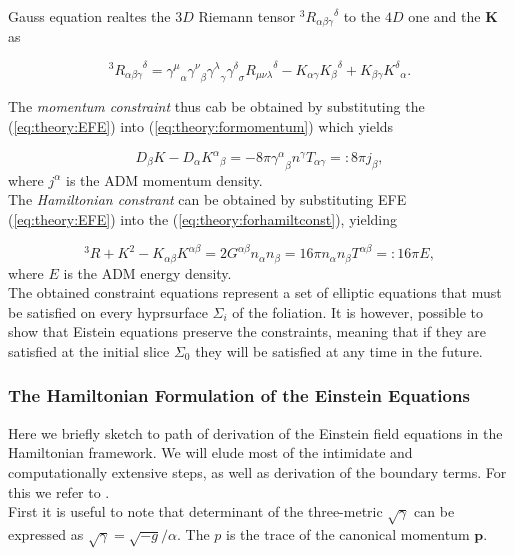 \documentclass[11pt,a4paper,headinclude=true,DIV=14,BCOR=8mm,chapterprefix,listof=totoc,twoside,openright,abstracton]{scrbook}
\begin{document}
Gauss equation realtes the $3D$ Riemann tensor $^3{R_{\alpha\beta\gamma}}^{\delta}$ to the $4D$ one and the $\boldsymbol{K}$ as

\begin{equation}
    ^3{R_{\alpha\beta\gamma}}^{\delta} = {\gamma^{\mu}}_{\alpha}{\gamma^{\nu}}_{\beta}{\gamma^{\lambda}}_{\gamma}{\gamma^{\delta}}_{\sigma}{R_{\mu\nu\lambda}}^{\delta}-K_{\alpha\gamma}{K_{\beta}}^{\delta}+K_{\beta\gamma}{K^{\delta}}_{\alpha}.
    \label{eq:theory:forhamiltconst}
\end{equation}

The \textit{momentum constraint} thus cab be obtained by substituting the (\ref{eq:theory:EFE}) into  (\ref{eq:theory:formomentum}) which yields

\begin{equation}
    D_{\beta}K-D_{\alpha}{K^{\alpha}}_{\beta} = -8\pi{\gamma^{\alpha}}_{\beta} n^{\gamma}T_{\alpha\gamma}=:8\pi j_{\beta},
    \label{eq:theory:momconstraint}
\end{equation}
where $j^{\alpha}$ is the ADM momentum density. \\

The \textit{Hamiltonian constrant} can be obtained by substituting EFE (\ref{eq:theory:EFE}) into the (\ref{eq:theory:forhamiltconst}), yielding 

\begin{equation}
    ^3 R+ K^2 - K_{\alpha\beta}K^{\alpha\beta} = 2G^{\alpha\beta}n_{\alpha}n_{\beta} = 16\pi n_{\alpha}n_{\beta} T^{\alpha\beta} =: 16\pi E,
    \label{eq:theory:hamilconstraint}
\end{equation}
where $E$ is the ADM energy density. \\

The obtained constraint equations represent a set of elliptic equations that must be satisfied on every hyprsurface $\Sigma_i$ of the foliation. It is however, possible to show that Eistein equations preserve the constraints, meaning that if they are satisfied at the initial slice $\Sigma_0$ they will be satisfied at any time in the future. 





\subsubsection{The Hamiltonian Formulation of the Einstein Equations}

Here we briefly sketch to path of derivation of the Einstein field equations in the Hamiltonian framework. We will elude most of the intimidate and computationally extensive steps, as well as derivation of the boundary terms. For this we refer to \cite{Poisson:2004}.\\
First it is useful to note that determinant of the three-metric $\sqrt{\gamma}$ can be expressed as $\sqrt{\gamma}=\sqrt{-g}/\alpha$. The $p$ is the trace of the canonical momentum $\boldsymbol{p}$.
\end{document}
